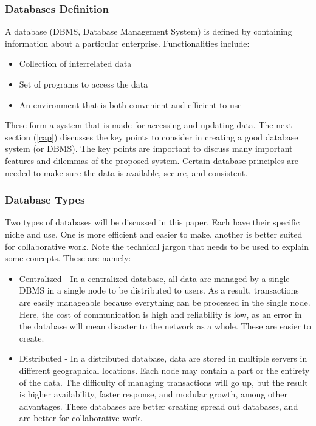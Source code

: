 \documentclass[acmsmall]{acmart}
\begin{document}
\subsubsection{Databases Definition}
A database (DBMS, Database Management System) is defined by containing information about a particular enterprise. Functionalities include: \cite{Silberschatz2010}
\begin{itemize}
    \item Collection of interrelated data
    \item Set of programs to access the data
    \item An environment that is both convenient and efficient to use
\end{itemize}

These form a system that is made for accessing and updating data. The next section (\ref{cap}) discusses the key points to consider in creating a good database system (or DBMS). The key points are important to discuss many important features and dilemmas of the proposed system. Certain database principles are needed to make sure the data is available, secure, and consistent. 



\subsubsection{Database Types} \label{db_types}
Two types of databases will be discussed in this paper. Each have their specific niche and use. One is more efficient and easier to make, another is better suited for collaborative work. Note the technical jargon that needs to be used to explain some concepts. These are namely: \cite{centralizedvsdistributed}

\begin{itemize}
    \item Centralized - In a centralized database, all data are managed by a single DBMS in a single node to be distributed to users. As a result, transactions are easily manageable because everything can be processed in the single node. Here, the cost of communication is high and reliability is low, as an error in the database will mean disaster to the network as a whole. These are easier to create.
    
    \item Distributed - In a distributed database, data are stored in multiple servers in different geographical locations. Each node may contain a part or the entirety of the data. The difficulty of managing transactions will go up, but the result is higher availability, faster response, and modular growth, among other advantages. These databases are better creating spread out databases, and are better for collaborative work.
\end{itemize}
\end{document}
